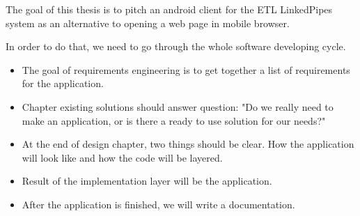 The goal of this thesis is to pitch an  android client for the ETL LinkedPipes  system as an alternative to opening a web page in mobile browser. 

In order to do that, we need to go through the whole software developing cycle. 
\begin{itemize}
    \item The goal of requirements engineering is to get together a list of requirements for the application.
    \item Chapter existing solutions should answer question: "Do we really need to make an application, or is there a ready to use solution for our needs?"
    \item At the end of design chapter, two things should be clear. How the application will look like and how the code will be layered.
    \item Result of the implementation layer will be the application.
    \item After the application is finished, we will write a documentation.
\end{itemize}